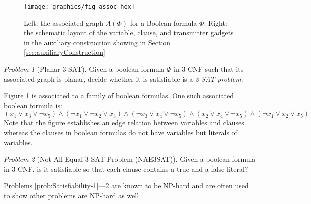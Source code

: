 \documentclass[10pt]{CSUNthesis}
\theoremstyle{plain}%
\theoremstyle{definition}
\theoremstyle{remark}
\newtheorem{prob}{Problem}
\newcommand{\set}[2]{{\left\lbrace \left.  #1 \left\vert #2  \right.\right.\right\rbrace  }}
\begin{document}
  \begin{figure}[htbp]
	\centering
	\texttt{[image: graphics/fig-assoc-hex]}
	\caption{Left: the associated graph $A(\Phi)$ for a Boolean formula $\Phi$.
Right: the schematic layout of the variable, clause, and transmitter gadgets in the auxiliary construction showing in Section \ref{sec:auxiliaryConstruction}}
	\label{fig:assoc}
\end{figure} 
\begin{prob}[Planar 3-SAT]
 Given a boolean formula $\Phi$ in 3-CNF such that its associated graph is planar, decide whether it 
is satisfiable is a \textit{3-SAT problem}.
\end{prob}
Figure \ref{fig:assoc} is associated to a family of boolean formulas.  
One such associated boolean formula is:
$$(x_1 \lor x_3 \lor \lnot x_5) \land (\lnot x_1 \lor \lnot x_2 \lor x_3) \land (\lnot x_3 \lor x_4 \lor \lnot x_5) \land (x_2 \lor x_4 \lor \lnot x_5) \land ( \lnot x_1 \lor x_2 \lor x_5)$$
Note that the figure establishes an edge relation between variables and clauses whereas the clauses in boolean formulas do not have variables but literals of variables.
\begin{prob}[Not All Equal 3 SAT Problem (NAE3SAT)]\label{prob:Satisfiability-2}%
Given a boolean formula in 3-CNF, is it satisfiable so that each clause contains a 
true and a false literal?
\end{prob}

Problems \ref{prob:Satisfiability-1}---\ref{prob:Satisfiability-2} are known to be NP-hard and are often used to show other problems are NP-hard as well \cite{lichtenstein1982planar,karp1972reducibility}.


% 
\end{document}
